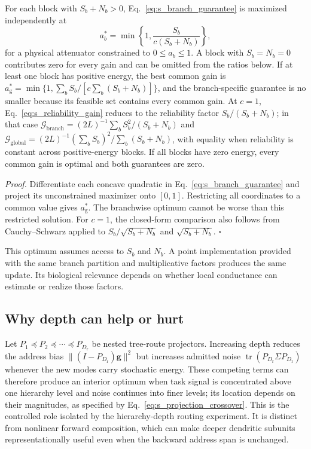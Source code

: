 \begin{proposition}
For each block with $S_b+N_b>0$, Eq.~\ref{eq:s_branch_guarantee} is
maximized independently at
\begin{equation}
a_b^*=\min\left\{1,\frac{S_b}{c(S_b+N_b)}\right\},
\label{eq:s_reliability_gain}
\end{equation}
for a physical attenuator constrained to $0\leq a_b\leq1$. A block with
$S_b=N_b=0$ contributes zero for every gain and can be omitted from the
ratios below. If at least one block has positive energy, the best common gain is
$a_{\mathrm g}^*=\min\{1,\sum_bS_b/[c\sum_b(S_b+N_b)]\}$, and the
branch-specific guarantee is no smaller because its feasible set contains
every common gain.  At $c=1$, Eq.~\ref{eq:s_reliability_gain} reduces to the
reliability factor $S_b/(S_b+N_b)$; in that case
$\mathcal G_{\mathrm{branch}}=(2L)^{-1}\sum_bS_b^2/(S_b+N_b)$ and
$\mathcal G_{\mathrm{global}}=(2L)^{-1}(\sum_bS_b)^2/
\sum_b(S_b+N_b)$, with equality when reliability is constant across
positive-energy blocks. If all blocks have zero energy, every common gain
is optimal and both guarantees are zero.
\end{proposition}

\noindent\emph{Proof.}
Differentiate each concave quadratic in Eq.~\ref{eq:s_branch_guarantee} and
project its unconstrained maximizer onto $[0,1]$.  Restricting all coordinates
to a common value gives $a_{\mathrm g}^*$.  The branchwise optimum cannot be
worse than this restricted solution.  For $c=1$, the closed-form comparison
also follows from Cauchy--Schwarz applied to
$S_b/\sqrt{S_b+N_b}$ and $\sqrt{S_b+N_b}$. \hfill$\square$

This optimum assumes access to $S_b$ and $N_b$. A point implementation
provided with the same branch partition and multiplicative factors produces
the same update. Its biological relevance depends on whether local conductance can
estimate or realize those factors.

\subsection{Why depth can help or hurt}

Let $P_1\preceq P_2\preceq\cdots\preceq P_{D_{\mathrm{r}}}$ be nested tree-route
projectors. Increasing depth reduces the address bias
$\lVert(I-P_{D_{\mathrm{r}}})\bm g\rVert^2$ but increases admitted noise
$\operatorname{tr}(P_{D_{\mathrm{r}}}\Sigma P_{D_{\mathrm{r}}})$ whenever the new modes carry stochastic
energy. These competing terms can therefore produce an interior optimum
when task signal is concentrated above one hierarchy level and noise
continues into finer levels; its location depends on their magnitudes, as
specified by Eq.~\ref{eq:s_projection_crossover}. This is the controlled role isolated by
the hierarchy-depth routing experiment. It is distinct from nonlinear forward
composition, which can make deeper dendritic subunits representationally
useful even when the backward address span is unchanged.

